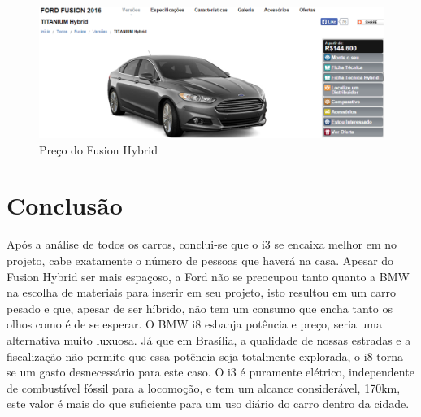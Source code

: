 \begin{figure}[H]
\begin{center}
\includegraphics[keepaspectratio,scale=0.5]{figuras/fusionpreco.eps}
\caption{Preço do Fusion Hybrid}
\end{center}
\end{figure}

\section{Conclusão}

Após a análise de todos os carros, conclui-se que o i3 se encaixa melhor em no projeto, cabe exatamente o número de pessoas que haverá na casa. Apesar do Fusion Hybrid ser mais espaçoso, a Ford não se preocupou tanto quanto a BMW na escolha de materiais para inserir em seu projeto, isto resultou em um carro pesado e que, apesar de ser híbrido, não tem um consumo que encha tanto os olhos como é de se esperar. O BMW i8 esbanja potência e preço, seria uma alternativa muito luxuosa. Já que em Brasília, a qualidade de nossas estradas e a fiscalização não permite que essa potência seja totalmente explorada, o i8 torna-se um gasto desnecessário para este caso. O i3 é puramente elétrico, independente de combustível fóssil para a locomoção, e tem um alcance considerável, 170km, este valor é mais do que suficiente para um uso diário do carro dentro da cidade.